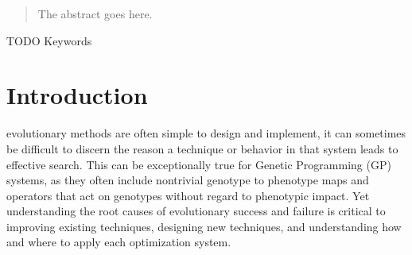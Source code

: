 \documentclass[journal]{IEEEtran}
\begin{document}







\maketitle

\begin{abstract}
The abstract goes here.
\end{abstract}

\begin{IEEEkeywords}
TODO Keywords
\end{IEEEkeywords}






%
\IEEEpeerreviewmaketitle



\section{Introduction}
% 
% 
% 
% 
 evolutionary methods are often simple to design
and implement, it can sometimes be difficult to discern the reason a technique
or behavior in that system leads to effective search.  This can be exceptionally
true for Genetic Programming (GP) systems, as they often include nontrivial
genotype to phenotype maps and operators that act on genotypes without regard to
phenotypic impact.  Yet understanding the root causes of evolutionary success
and failure is critical to improving existing techniques, designing new techniques,
and understanding how and where to apply each optimization system.
\end{document}
